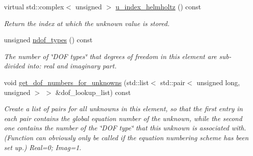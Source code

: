 \begin{DoxyCompactItemize}
virtual std\+::complex$<$ unsigned $>$ \hyperlink{classoomph_1_1PMLHelmholtzFluxElement_a2c3019be4606aa2e67209f1dd7c3bb60}{u\+\_\+index\+\_\+helmholtz} () const
\begin{DoxyCompactList}\small\item\em Return the index at which the unknown value is stored. \end{DoxyCompactList}\item 
unsigned \hyperlink{classoomph_1_1PMLHelmholtzFluxElement_a9a872ad9cdfe2400f2be301c7fd84e86}{ndof\+\_\+types} () const
\begin{DoxyCompactList}\small\item\em The number of \char`\"{}\+D\+O\+F types\char`\"{} that degrees of freedom in this element are sub-\/divided into\+: real and imaginary part. \end{DoxyCompactList}\item 
void \hyperlink{classoomph_1_1PMLHelmholtzFluxElement_ab0a237a8c1b4d1ce6d59861a49afa113}{get\+\_\+dof\+\_\+numbers\+\_\+for\+\_\+unknowns} (std\+::list$<$ std\+::pair$<$ unsigned long, unsigned $>$ $>$ \&dof\+\_\+lookup\+\_\+list) const
\begin{DoxyCompactList}\small\item\em Create a list of pairs for all unknowns in this element, so that the first entry in each pair contains the global equation number of the unknown, while the second one contains the number of the \char`\"{}\+D\+O\+F type\char`\"{} that this unknown is associated with. (Function can obviously only be called if the equation numbering scheme has been set up.) Real=0; Imag=1. \end{DoxyCompactList}\end{DoxyCompactItemize}
